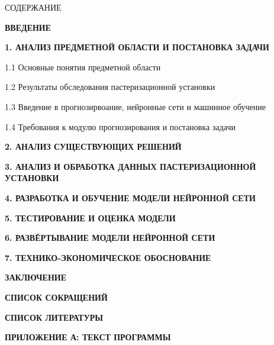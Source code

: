 {\gostTitleFont
    \redline
    СОДЕРЖАНИЕ
} 

\titlespace

{\gostFont

    \par {\bfseries ВВЕДЕНИЕ }
    \par {\bfseries 1. АНАЛИЗ ПРЕДМЕТНОЙ ОБЛАСТИ И ПОСТАНОВКА ЗАДАЧИ }
    \par 1.1 Основные понятия предметной области 
    \par 1.2 Результаты обследования пастеризационной установки  
    \par 1.3 Введение в прогнозирвоание, нейронные сети и машинное обучение  
    \par 1.4 Требования к модулю прогнозирования и постановка задачи  
    \par {\bfseries 2. АНАЛИЗ СУЩЕСТВУЮЩИХ РЕШЕНИЙ }
    \par {\bfseries 3. АНАЛИЗ И ОБРАБОТКА ДАННЫХ ПАСТЕРИЗАЦИОННОЙ УСТАНОВКИ }
    \par {\bfseries 4. РАЗРАБОТКА И ОБУЧЕНИЕ МОДЕЛИ НЕЙРОННОЙ СЕТИ }
    \par {\bfseries 5. ТЕСТИРОВАНИЕ И ОЦЕНКА МОДЕЛИ }
    \par {\bfseries 6. РАЗВЁРТЫВАНИЕ МОДЕЛИ НЕЙРОННОЙ СЕТИ }
    \par {\bfseries 7. ТЕХНИКО-ЭКОНОМИЧЕСКОЕ ОБОСНОВАНИЕ }
    \par {\bfseries ЗАКЛЮЧЕНИЕ } 
    \par {\bfseries СПИСОК СОКРАЩЕНИЙ } 
    \par {\bfseries СПИСОК ЛИТЕРАТУРЫ } 
    \par {\bfseries ПРИЛОЖЕНИЕ А: ТЕКСТ ПРОГРАММЫ} 
    \par 
}